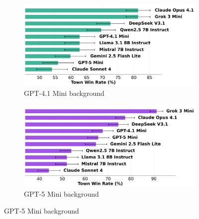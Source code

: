 \documentclass{article}
\begin{document}
\begin{figure}[htbp]
    \centering
    \begin{subfigure}[b]{0.48\textwidth}
        \centering
        \includegraphics[width=\textwidth]{../results/win_rates_detect_gpt-41_mini.png}
        \caption{GPT-4.1 Mini background}
        \label{fig:villager_gpt41mini_appendix}
    \end{subfigure}
    \hfill
    \begin{subfigure}[b]{0.48\textwidth}
        \centering
        \includegraphics[width=\textwidth]{../results/win_rates_detect_grok_3_mini.png}
        \caption{GPT-5 Mini background}
        \label{fig:villager_gpt5mini_appendix}
    \end{subfigure}
    
    \vspace{0.5cm}
    

\end{figure}
\end{document}
